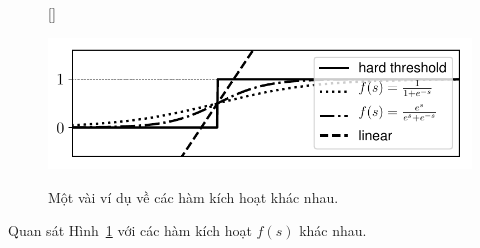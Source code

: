 \begin{figure}[t]
    [\FBwidth]
    {\caption{ 
    Một vài ví dụ về các hàm kích hoạt khác nhau.
    }
    \label{fig:10_activation}}
    { %
    \includegraphics[width=.6\textwidth]{ebookML_src/src/logistic_regression/activation.pdf}
    }
\end{figure}
Quan sát Hình~\ref{fig:10_activation} với các hàm kích hoạt $f(s)$ khác nhau.
